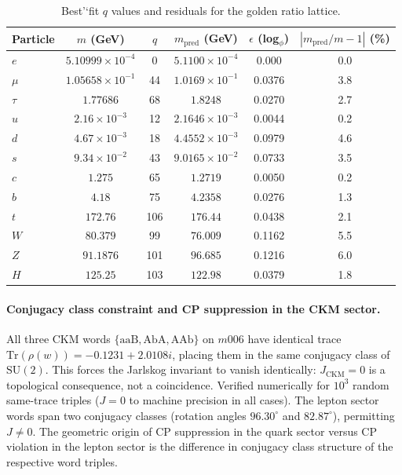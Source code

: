 ﻿\documentclass[12pt]{article}
\theoremstyle{definition}
\begin{document}
\begin{table}[htbp]
\centering
\caption{Best'`fit $q$ values and residuals for the golden ratio lattice.}
\label{tab:masses}
\begin{tabular}{lccccc}
\toprule
Particle & $m$ (GeV) & $q$ & $m_{\text{pred}}$ (GeV) & $\epsilon$ (log$_\phi$) & $|m_{\text{pred}}/m - 1|$ (\%) \\
\midrule
$e$     & $5.10999\times10^{-4}$ & 0    & $5.1100\times10^{-4}$ & 0.000 & 0.0\\
$\mu$   & $1.05658\times10^{-1}$ & 44   & $1.0169\times10^{-1}$ & 0.0376 & 3.8\\
$\tau$  & $1.77686$              & 68   & $1.8248$               & 0.0270 & 2.7\\
$u$     & $2.16\times10^{-3}$    & 12   & $2.1646\times10^{-3}$ & 0.0044 & 0.2\\
$d$     & $4.67\times10^{-3}$    & 18   & $4.4552\times10^{-3}$ & 0.0979 & 4.6\\
$s$     & $9.34\times10^{-2}$    & 43   & $9.0165\times10^{-2}$ & 0.0733 & 3.5\\
$c$     & $1.275$                & 65   & $1.2719$               & 0.0050 & 0.2\\
$b$     & $4.18$                 & 75   & $4.2358$               & 0.0276 & 1.3\\
$t$     & $172.76$               & 106  & $176.44$               & 0.0438 & 2.1\\
$W$     & $80.379$               & 99   & $76.009$               & 0.1162 & 5.5\\
$Z$     & $91.1876$              & 101  & $96.685$               & 0.1216 & 6.0\\
$H$     & $125.25$               & 103  & $122.98$               & 0.0379 & 1.8\\
\bottomrule
\end{tabular}
\end{table}


\paragraph{Conjugacy class constraint and CP suppression in the CKM sector.}
All three CKM words $\{\mathrm{aaB},\mathrm{AbA},\mathrm{AAb}\}$ on $m006$
have identical trace $\mathrm{Tr}(\rho(w))=-0.1231+2.0108i$,
placing them in the same conjugacy class of $\mathrm{SU}(2)$.
This forces the Jarlskog invariant to vanish identically: $J_{\mathrm{CKM}}=0$
is a topological consequence, not a coincidence.
Verified numerically for $10^3$ random same-trace triples ($J=0$ to
machine precision in all cases).
The lepton sector words span two conjugacy classes
(rotation angles $96.30^\circ$ and $82.87^\circ$), permitting $J\neq0$.
The geometric origin of CP suppression in the quark sector versus
CP violation in the lepton sector is the difference in conjugacy class
structure of the respective word triples.
\end{document}
